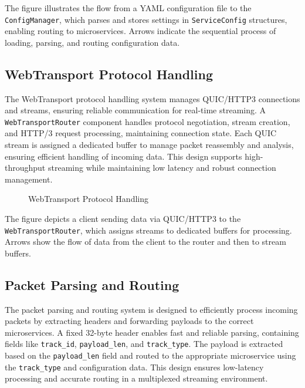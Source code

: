 The figure illustrates the flow from a YAML configuration file to the \texttt{ConfigManager}, which parses and stores settings in \texttt{ServiceConfig} structures, enabling routing to microservices. Arrows indicate the sequential process of loading, parsing, and routing configuration data.

\subsection{WebTransport Protocol Handling}

The WebTransport protocol handling system manages QUIC/HTTP3 connections and streams, ensuring reliable communication for real-time streaming. A \texttt{WebTransportRouter} component handles protocol negotiation, stream creation, and HTTP/3 request processing, maintaining connection state. Each QUIC stream is assigned a dedicated buffer to manage packet reassembly and analysis, ensuring efficient handling of incoming data. This design supports high-throughput streaming while maintaining low latency and robust connection management.

\begin{figure}[h]
\centering
{}
\caption{WebTransport Protocol Handling}
\label{fig:webtransport}
\end{figure}

The figure depicts a client sending data via QUIC/HTTP3 to the \texttt{WebTransportRouter}, which assigns streams to dedicated buffers for processing. Arrows show the flow of data from the client to the router and then to stream buffers.

\subsection{Packet Parsing and Routing}

The packet parsing and routing system is designed to efficiently process incoming packets by extracting headers and forwarding payloads to the correct microservices. A fixed 32-byte header enables fast and reliable parsing, containing fields like \texttt{track\_id}, \texttt{payload\_len}, and \texttt{track\_type}. The payload is extracted based on the \texttt{payload\_len} field and routed to the appropriate microservice using the \texttt{track\_type} and configuration data. This design ensures low-latency processing and accurate routing in a multiplexed streaming environment.

